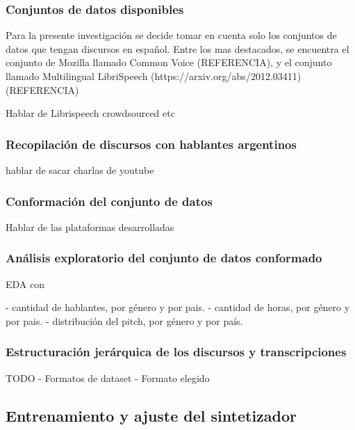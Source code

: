 \subsubsection{Conjuntos de datos disponibles}
Para la presente investigación se decide tomar en cuenta solo los conjuntos de datos que tengan discursos en español. Entre los mas destacados, se encuentra el conjunto de Mozilla llamado Common Voice (REFERENCIA), y el conjunto llamado Multilingual LibriSpeech (https://arxiv.org/abs/2012.03411) (REFERENCIA)

Hablar de Librispeech crowdsourced etc

\subsubsection{Recopilación de discursos con hablantes argentinos}
hablar de sacar charlas de youtube

\subsubsection{Conformación del conjunto de datos}
Hablar de las plataformas desarrolladas

\subsubsection{Análisis exploratorio del conjunto de datos conformado}

EDA con

- cantidad de hablantes, por género y por pais.
- cantidad de horas, por género y por pais.
- distribución del pitch, por género y por país.

\subsubsection{Estructuración jerárquica de los discursos y transcripciones}
TODO
- Formatos de dataset
- Formato elegido

\subsection{Entrenamiento y ajuste del sintetizador}

